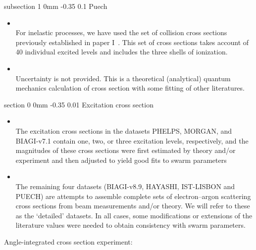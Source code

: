 \documentclass[11pt]{article}
\makeatletter
\renewcommand{\section}{\@startsection
{section}%
{0}%
{0mm}%
{-0.35\baselineskip}%
{0.01\baselineskip}%
{\normalfont\Large\bfseries\color{myTan}}}%
\renewcommand{\subsection}{\@startsection
{subsection}%
{1}%
{0mm}%
{-0.35\baselineskip}%
{0.1\baselineskip}%
{\normalfont\large\bfseries\color{myTan}}}%
\makeatother
\begin{document}
\subsection{Puech}
\begin{itemize}
\item \cite{Puech1986}\\
For inelastic processes, we have used the set of collision cross sections previously established in paper I~\cite{Bretagne1986}.
This set of cross sections takes account of 40 individual excited levels and includes the three shells of ionization.
\item \cite{Bretagne1986}\\
Uncertainty is not provided. This is a theoretical (analytical) quantum mechanics calculation of cross section with some fitting of other literatures.
\end{itemize}

\clearpage

\section{Excitation cross section}

\begin{itemize}
\item \cite{Pitchford2013}\\
The excitation cross sections in the datasets PHELPS,
MORGAN, and BIAGI-v7.1 contain one, two, or three excitation levels, respectively, and the magnitudes of these cross sections were first estimated by theory and/or experiment and then adjusted to yield good fits to swarm parameters
\item \cite{Pitchford2013}\\
The remaining four datasets (BIAGI-v8.9, HAYASHI,
IST-LISBON and PUECH) are attempts to assemble complete sets of electron–argon scattering cross sections from beam measurements and/or theory. We will refer to these as the ‘detailed’ datasets. In all cases, some modifications or extensions of the literature values were needed to obtain consistency with swarm parameters.
\end{itemize}

Angle-integrated cross section experiment: \cite{Chutjian1981,Filipovic2000,Khakoo2003}
\end{document}
